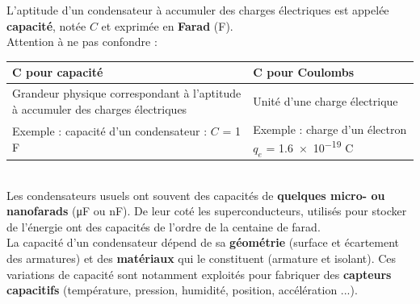\documentclass[a4paper,11pt,fleqn]{article}%
\begin{document}
L'aptitude d'un condensateur à accumuler des charges électriques est appelée \textbf{capacité}, notée $C$ et exprimée en \textbf{Farad} (\unit{\farad}).\\
Attention à ne pas confondre :\\
\begin{tabular}{|>{\centering}m{9cm}||>{\centering\arraybackslash}m{9cm}|}
	\hline \textbf{C pour capacité} & \textbf{C pour Coulombs}\\
	\hline Grandeur physique correspondant à l'aptitude à accumuler des charges électriques & Unité d'une charge électrique\\
	\hline Exemple : capacité d'un condensateur : $C$ = \num{1} \unit{\farad} & Exemple : charge d'un électron $q_e$ = \num{1,6e-19} \unit{\coulomb}\\
	\hline
\end{tabular}\\

Les condensateurs usuels ont souvent des capacités de \textbf{quelques micro- ou nanofarads} (\unit{\micro\farad} ou \unit{\nano\farad}). De leur coté les superconducteurs, utilisés pour stocker de l'énergie ont des capacités de l'ordre de la centaine de farad.\\
La capacité d'un condensateur dépend de sa \textbf{géométrie} (surface et écartement des armatures) et des \textbf{matériaux} qui le constituent (armature et isolant). Ces variations de capacité sont notamment exploités pour fabriquer des \textbf{capteurs capacitifs} (température, pression, humidité, position, accélération ...).
\end{document}
